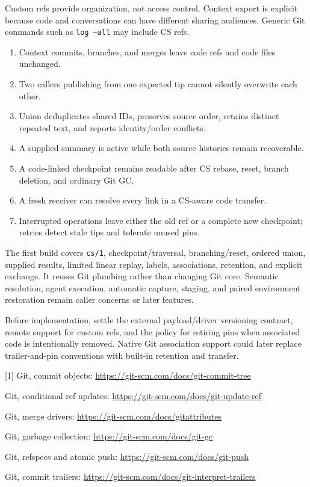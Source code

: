 \documentclass[11pt,letterpaper]{article}
\newcommand{\subsect}[1]{\vspace{3pt}{\bfseries\textcolor{ink}{#1}}\par}
\newcommand{\code}[1]{{\small\texttt{#1}}}
\begin{document}
Custom refs provide organization, not access control. Context export is
explicit because code and conversations can have different sharing audiences.
Generic Git commands such as \code{log --all} may include CS refs.

\subsect{First-build acceptance criteria}
\begin{enumerate}
\item Context commits, branches, and merges leave code refs and code files unchanged.
\item Two callers publishing from one expected tip cannot silently overwrite each other.
\item Union deduplicates shared IDs, preserves source order, retains distinct repeated text, and reports identity/order conflicts.
\item A supplied summary is active while both source histories remain recoverable.
\item A code-linked checkpoint remains readable after CS rebase, reset, branch deletion, and ordinary Git GC.
\item A fresh receiver can resolve every link in a CS-aware code transfer.
\item Interrupted operations leave either the old ref or a complete new checkpoint; retries detect stale tips and tolerate unused pins.
\end{enumerate}

\subsect{Scope and decisions still open}
The first build covers \code{cs/1}, checkpoint/traversal, branching/reset,
ordered union, supplied results, limited linear replay, labels, associations,
retention, and explicit exchange. It reuses Git plumbing rather than changing
Git core. Semantic resolution, agent execution, automatic capture, staging,
and paired environment restoration remain caller concerns or later features.

Before implementation, settle the external payload/driver versioning contract,
remote support for custom refs, and the policy for retiring pins when associated
code is intentionally removed. Native Git association support could later
replace trailer-and-pin conventions with built-in retention and transfer.

\subsect{Primary references}
{\footnotesize
[1] Git, commit objects: \url{https://git-scm.com/docs/git-commit-tree}\par
[2] Git, conditional ref updates: \url{https://git-scm.com/docs/git-update-ref}\par
[3] Git, merge drivers: \url{https://git-scm.com/docs/gitattributes}\par
[4] Git, garbage collection: \url{https://git-scm.com/docs/git-gc}\par
[5] Git, refspecs and atomic push: \url{https://git-scm.com/docs/git-push}\par
[6] Git, commit trailers: \url{https://git-scm.com/docs/git-interpret-trailers}
}
\end{document}

